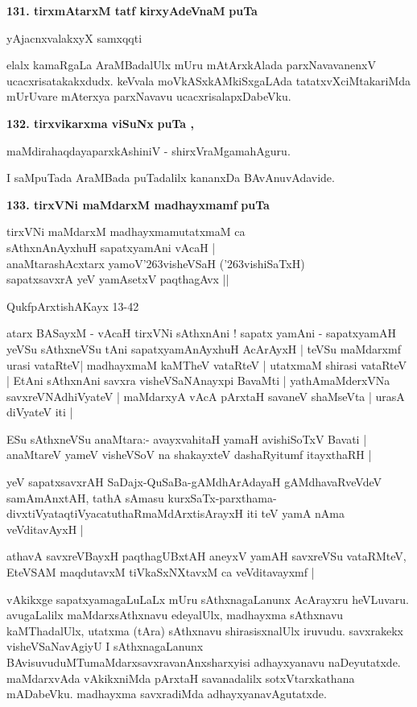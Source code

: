 \medskip
\noindent
\textbf{131. tirxmAtarxM tatf kirxyAdeVnaM} \hfill{\bf puTa \pageref{147}}

\hfill{yAjacnxvalakxyX samxqqti}

\smallskip
elalx kamaRgaLa AraMBadalUlx mUru mAtArxkAlada parxNavavanenxV ucacxrisa\-takakxdudx. keVvala moVkASxkAMkiSxgaLAda tatatxvXciMtakariMda mUrUvare mAterxya parxNavavu ucacxrisalapxDabeVku.

\medskip
\noindent
\textbf{132. tirxvikarxma viSuNx} \hfill{\bf puTa \pageref{81}, \pageref{103}}

\hfill{maMdirahaqdayaparxkAshiniV - shirxVraMgamahAguru.}

\smallskip
I saMpuTada AraMBada puTadalilx kananxDa BAvAnuvAdavide.

\medskip
\noindent
\textbf{133. tirxVNi maMdarxM madhayxmamf} \hfill{\bf puTa \pageref{154}}

\smallskip
\begin{shloka}
tirxVNi maMdarxM madhayxmamutatxmaM ca\\
sAthxnAnAyxhuH sapatxyamAni vAcaH |\\
anaMtarashAcxtarx yamoV\char'263visheVSaH (\char'263vishiSaTxH)\\
sapatxsavxrA yeV yamAsetxV paqthagAvx ||
\end{shloka}

\hfill{QukfpArxtishAKayx 13-42}

atarx BASayxM - vAcaH tirxVNi sAthxnAni ! sapatx yamAni - sapatxyamAH yeVSu sAthxneVSu tAni sapatx\-yamAnAyxhuH AcArAyxH | teVSu maMdarxmf urasi vataRteV| madhayxmaM kaMTheV vataRteV | utatxmaM shirasi vataRteV | EtAni sAthxnAni savxra visheVSaNAnayxpi BavaMti | yathAmaMderxVNa savxreVNAdhiVyateV | maMdarxyA vAcA pArxtaH savaneV shaMseVta | urasA diVyateV iti |

ESu sAthxneVSu anaMtara:- avayxvahitaH yamaH avishiSoTxV Bavati | anaMtareV yameV visheVSoV\- na shakayxteV dashaRyitumf itayxthaRH |

yeV sapatxsavxrAH SaDajx-QuSaBa-gAMdhArAdayaH gAMdhavaRveVdeV samAmAnxtAH, tathA sAmasu kurxSaTx-parxthama-divxtiVyataqtiVyacatuthaRmaMdArxtisArayxH iti teV yamA nAma veVditavAyxH |

athavA savxreVBayxH paqthagUBxtAH aneyxV yamAH savxreVSu vataRMteV, EteVSAM maqdutavxM tiVkaSxNXtavxM ca veVditavayxmf |

vAkikxge sapatxyamagaLuLaLx mUru sAthxnagaLanunx AcArayxru heVLuvaru. avugaLalilx maMdarxsAthxnavu edeyalUlx, madhayxma sAthxnavu kaMThadalUlx, utatxma (tAra) sAthxnavu shirasisxnalUlx iruvudu. savxrakekx visheV\-SaNavAgiyU I sAthxnagaLanunx BAvisuvuduMTumaMdarxsavxravanAnxsharxyisi adhayxyanavu naDeyutatxde. maMdarxvAda vAkikxniMda pArxtaH savanadalilx sotxVtarxkathana mADabeVku. madhayxma savxradiMda adhayxyana\-vAgu\-tatxde.


